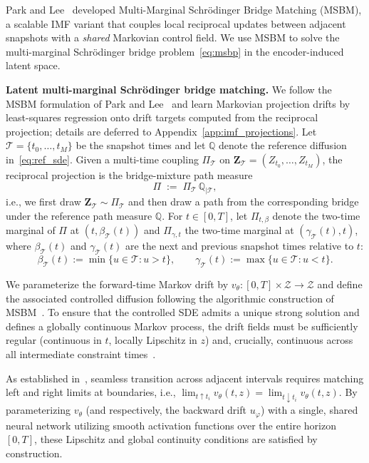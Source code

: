 \documentclass[review,onefignum,onetabnum]{siamart250211}
\newcommand{\1}{\mathbf{1}}
\newcommand{\cZ}{\mathcal{Z}}
\newcommand{\bphi}{\varphi}
\begin{document}
Park and Lee~\cite{park2025msbm} developed Multi-Marginal Schr\"odinger Bridge Matching (\textsc{MSBM}), a scalable IMF variant that couples local reciprocal updates between adjacent snapshots with a \emph{shared} Markovian control field. We use \textsc{MSBM} to solve the multi-marginal Schr\"odinger bridge problem~\eqref{eq:msbp} in the encoder-induced latent space.


\noindent\textbf{Latent multi-marginal Schr\"odinger bridge matching.}
We follow the \textsc{MSBM} formulation of Park and Lee~\cite{park2025msbm} and learn Markovian projection drifts by least-squares regression onto drift targets computed from the reciprocal projection; details are deferred to Appendix~\ref{app:imf_projections}.
Let $\mathcal{T}=\{t_0,\ldots,t_M\}$ be the snapshot times and let $\mathbb{Q}$ denote the reference diffusion in~\eqref{eq:ref_sde}.
Given a multi-time coupling $\Pi_{\mathcal{T}}$ on $\mathbf{Z}_{\mathcal{T}}=(Z_{t_0},\ldots,Z_{t_M})$, the reciprocal projection is the bridge-mixture path measure
\[
\Pi \;:=\; \Pi_{\mathcal{T}}\,\mathbb{Q}_{\mid \mathcal{T}},
\]
i.e., we first draw $\mathbf{Z}_{\mathcal{T}}\sim\Pi_{\mathcal{T}}$ and then draw a path from the corresponding bridge under the reference path measure $\mathbb{Q}$.
For $t\in[0,T]$, let $\Pi_{t,\beta}$ denote the two-time marginal of $\Pi$ at $(t,\beta_{\mathcal{T}}(t))$ and $\Pi_{\gamma,t}$ the two-time marginal at $(\gamma_{\mathcal{T}}(t),t)$, where $\beta_{\mathcal{T}}(t)$ and $\gamma_{\mathcal{T}}(t)$ are the next and previous snapshot times relative to $t$: 
\begin{equation}\label{eq:beta_gamma}
\beta_{\mathcal{T}}(t):=\min\{u\in\mathcal{T}:u>t\},\qquad
\gamma_{\mathcal{T}}(t):=\max\{u\in\mathcal{T}:u<t\}.
\end{equation}

We parameterize the forward-time Markov drift by $v_\theta:[0,T]\times\cZ\to\cZ$ and define the associated controlled diffusion following the algorithmic construction of \textsc{MSBM}~\cite{park2025msbm}. To ensure that the controlled SDE admits a unique strong solution and defines a globally continuous Markov process, the drift fields must be sufficiently regular (continuous in $t$, locally Lipschitz in $z$) and, crucially, continuous across all intermediate constraint times~\cite{park2025msbm}.

As established in~\cite[Corollary~5]{park2025msbm}, seamless transition across adjacent intervals requires matching left and right limits at boundaries, i.e., $\lim_{t \uparrow t_i} v_\theta(t, z) = \lim_{t \downarrow t_i} v_\theta(t, z)$. By parameterizing $v_\theta$ (and respectively, the backward drift $u_\bphi$) with a single, shared neural network utilizing smooth activation functions over the entire horizon $[0,T]$, these Lipschitz and global continuity conditions are satisfied by construction.
\end{document}
